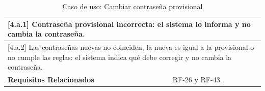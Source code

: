 \begin{table}[h!]
\begin{tabular}{|p{4cm}|p{11cm}|}
        \hline
        \multicolumn{2}{|p{15cm}|}{ [4.a.1] Contraseña provisional incorrecta: el sistema lo informa y no cambia la contraseña. } \\
        \hline
        \multicolumn{2}{|p{15cm}|}{ [4.a.2] Las contraseñas nuevas no coinciden, la nueva es igual a la provisional o no cumple las reglas: el sistema indica qué debe corregir y no cambia la contraseña. } \\
        \hline
        \textbf{Requisitos Relacionados} & RF-26 y RF-43. \\
        \hline
    \end{tabular}
    \caption{Caso de uso: Cambiar contraseña provisional}
\end{table}

\begin{table}[h!]
    \centering
    \renewcommand{\arraystretch}{1.5}


\end{table}
